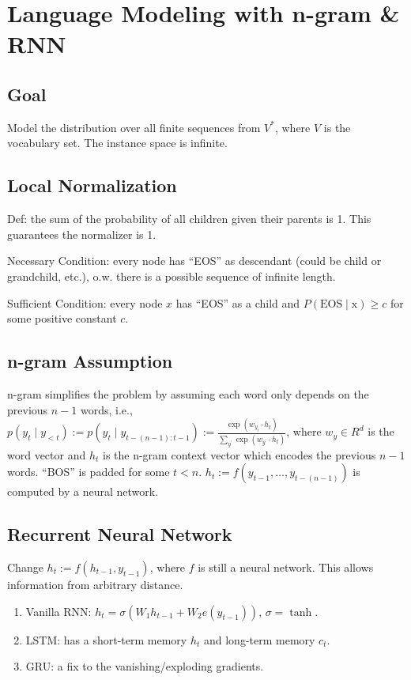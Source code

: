 \section{Language Modeling with n-gram \& RNN}

\subsection*{Goal}

Model the distribution over all finite sequences from $V^*$, where $V$ is the vocabulary set. The instance space is infinite.

\subsection*{Local Normalization}

Def: the sum of the probability of all children given their parents is 1. This guarantees the normalizer is 1.

Necessary Condition: every node has ``EOS'' as descendant (could be child or grandchild, etc.), o.w. there is a possible sequence of infinite length.

Sufficient Condition: every node $x$ has ``EOS'' as a child and $P(\text{EOS}\mid \text{x})\ge c$ for some positive constant $c$.

\subsection*{n-gram Assumption}

n-gram simplifies the problem by assuming each word only depends on the previous $n-1$ words, i.e.,
$p(y_t\mid y_{<t}) := p(y_t\mid y_{t-(n-1):t-1}) := \frac{\exp(w_{y_t}\cdot h_t)}{\sum_{y^\prime} \exp(w_{y^\prime}\cdot h_t)}$, where $w_y\in R^d$ is the word vector and $h_t$ is the n-gram context vector which encodes the previous $n-1$ words. ``BOS'' is padded for some $t<n$. $h_t:=f(y_{t-1}, \dots, y_{t-(n-1)})$ is computed by a neural network.

\subsection*{Recurrent Neural Network}

Change $h_t:=f(h_{t-1}, y_{t-1})$, where $f$ is still a neural network. This allows information from arbitrary distance.

\begin{enumerate}
    \item Vanilla RNN: $h_t=\sigma(W_1 h_{t-1}+W_2 e(y_{t-1}))$, $\sigma=\tanh$.
    \item LSTM: has a short-term memory $h_t$ and long-term memory $c_t$.
    \item GRU: a fix to the vanishing/exploding gradients.
\end{enumerate}
